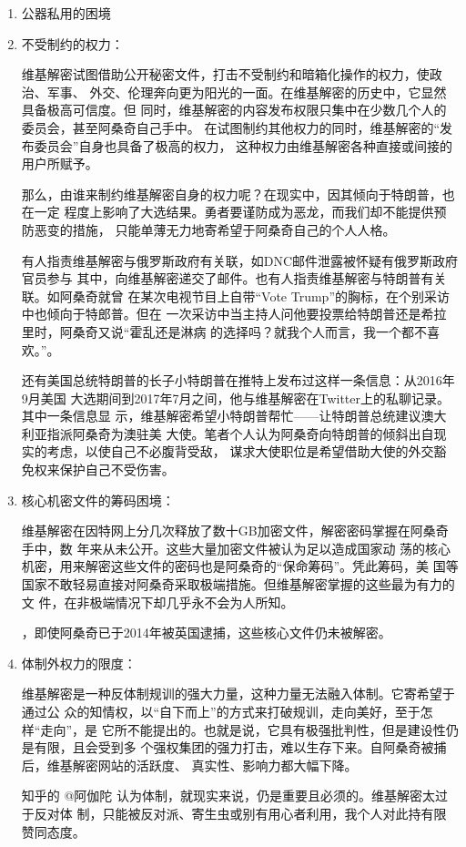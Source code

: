 \begin{enumerate}
\item 公器私用的困境


\item 不受制约的权力：

  维基解密试图借助公开秘密文件，打击不受制约和暗箱化操作的权力，使政治、军事、
  外交、伦理奔向更为阳光的一面。在维基解密的历史中，它显然具备极高可信度。但
  同时，维基解密的内容发布权限只集中在少数几个人的委员会，甚至阿桑奇自己手中。
  在试图制约其他权力的同时，维基解密的“发布委员会”自身也具备了极高的权力，
  这种权力由维基解密各种直接或间接的用户所赋予。

  那么，由谁来制约维基解密自身的权力呢？在现实中，因其倾向于特朗普，也在一定
  程度上影响了大选结果。勇者要谨防成为恶龙，而我们却不能提供预防恶变的措施，
  只能单薄无力地寄希望于阿桑奇自己的个人人格。

  有人指责维基解密与俄罗斯政府有关联，如DNC邮件泄露被怀疑有俄罗斯政府官员参与
  其中，向维基解密递交了邮件。也有人指责维基解密与特朗普有关联。如阿桑奇就曾
  在某次电视节目上自带“Vote Trump”的胸标，在个别采访中也倾向于特郎普。但在
  一次采访中当主持人问他要投票给特朗普还是希拉里时，阿桑奇又说“霍乱还是淋病
  的选择吗？就我个人而言，我一个都不喜欢。”。

  还有美国总统特朗普的长子小特朗普在推特上发布过这样一条信息：从2016年9月美国
  大选期间到2017年7月之间，他与维基解密在Twitter上的私聊记录。其中一条信息显
  示，维基解密希望小特朗普帮忙——让特朗普总统建议澳大利亚指派阿桑奇为澳驻美
  大使。笔者个人认为阿桑奇向特朗普的倾斜出自现实的考虑，以使自己不必腹背受敌，
  谋求大使职位是希望借助大使的外交豁免权来保护自己不受伤害。

\item 核心机密文件的筹码困境：

  维基解密在因特网上分几次释放了数十GB加密文件，解密密码掌握在阿桑奇手中，数
  年来从未公开。这些大量加密文件被认为足以造成国家动
  荡的核心机密，用来解密这些文件的密码也是阿桑奇的“保命筹码”。凭此筹码，美
  国等国家不敢轻易直接对阿桑奇采取极端措施。但维基解密掌握的这些最为有力的文
  件，在非极端情况下却几乎永不会为人所知。

  ，即使阿桑奇已于2014年被英国逮捕，这些核心文件仍未被解密。

\item 体制外权力的限度：

  维基解密是一种反体制规训的强大力量，这种力量无法融入体制。它寄希望于通过公
  众的知情权，以“自下而上”的方式来打破规训，走向美好，至于怎样“走向”，是
  它所不能提出的。也就是说，它具有极强批判性，但是建设性仍是有限，且会受到多
  个强权集团的强力打击，难以生存下来。自阿桑奇被捕后，维基解密网站的活跃度、
  真实性、影响力都大幅下降。

  知乎的 @阿伽陀 认为体制，就现实来说，仍是重要且必须的。维基解密太过于反对体
  制，只能被反对派、寄生虫或别有用心者利用，我个人对此持有限赞同态度。
\end{enumerate}


